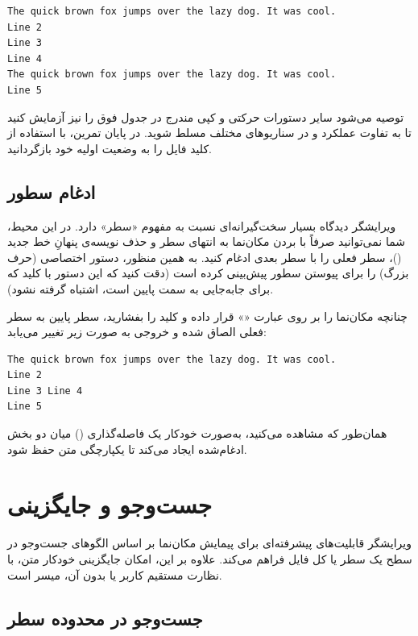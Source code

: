 \begin{latin}
\begin{lstlisting}
The quick brown fox jumps over the lazy dog. It was cool.
Line 2
Line 3
Line 4
The quick brown fox jumps over the lazy dog. It was cool.
Line 5
\end{lstlisting}
\end{latin}

توصیه می‌شود سایر دستورات حرکتی و کپی مندرج در جدول فوق را نیز آزمایش کنید تا به تفاوت عملکرد  و  در سناریوهای مختلف مسلط شوید. در پایان تمرین، با استفاده از کلید  فایل را به وضعیت اولیه خود بازگردانید.

\subsection{ادغام سطور}

ویرایشگر  دیدگاه بسیار سخت‌گیرانه‌ای نسبت به مفهوم «سطر» دارد. در این محیط، شما نمی‌توانید صرفاً با بردن مکان‌نما به انتهای سطر و حذف نویسه‌ی پنهانِ خط جدید ()، سطر فعلی را با سطر بعدی ادغام کنید. به همین منظور،  دستور اختصاصی  (حرف بزرگ) را برای پیوستن سطور پیش‌بینی کرده است (دقت کنید که این دستور با کلید  که برای جابه‌جایی به سمت پایین است، اشتباه گرفته نشود).

چنانچه مکان‌نما را بر روی عبارت «» قرار داده و کلید  را بفشارید، سطر پایین به سطر فعلی الصاق شده و خروجی به صورت زیر تغییر می‌یابد:

\begin{latin}
\begin{lstlisting}
The quick brown fox jumps over the lazy dog. It was cool.
Line 2
Line 3 Line 4
Line 5
\end{lstlisting}
\end{latin}

همان‌طور که مشاهده می‌کنید،  به‌صورت خودکار یک فاصله‌گذاری () میان دو بخش ادغام‌شده ایجاد می‌کند تا یکپارچگی متن حفظ شود.

\section{جست‌وجو و جایگزینی}

ویرایشگر  قابلیت‌های پیشرفته‌ای برای پیمایش مکان‌نما بر اساس الگوهای جست‌وجو در سطح یک سطر یا کل فایل فراهم می‌کند. علاوه بر این، امکان جایگزینی خودکار متن، با نظارت مستقیم کاربر یا بدون آن، میسر است.

\subsection{جست‌وجو در محدوده سطر}

